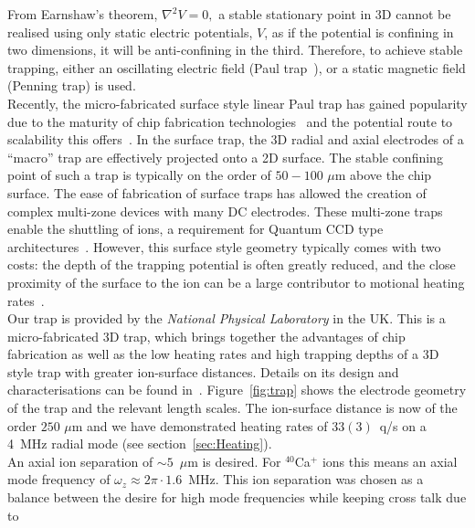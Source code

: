     From Earnshaw's theorem,
    $\nabla^2 V = 0,$ a stable stationary point in 3D cannot be realised
    using only static electric potentials, $V$, as if the potential is confining
    in two dimensions, it will be anti-confining in the third. Therefore, to
    achieve stable trapping, either an oscillating electric field (Paul
    trap~\cite{paul1990electromagnetic}), or a static magnetic field (Penning trap) is
    used.\\
    Recently, the micro-fabricated surface style linear Paul trap has gained
    popularity due to the maturity of chip fabrication
    technologies~\cite{allcock2011surface-electrode} and the potential route
    to scalability this offers~\cite{kielpinski2002architecture}. In the surface trap, the 3D radial and axial
    electrodes of a ``macro'' trap are effectively projected onto a 2D surface.
    The stable confining point of such a trap is typically on the order of $50-100$ $\mu$m
    above the chip surface. The ease of fabrication of surface traps has allowed
    the creation of complex multi-zone devices with many DC electrodes.  These
    multi-zone traps enable the shuttling of ions, a requirement for Quantum CCD
    type architectures~\cite{kielpinski2002architecture}. However, this
    surface style geometry typically comes with two costs: the depth of the
    trapping potential is often greatly reduced, and the close proximity of the
    surface to the ion can be a large contributor to motional heating
    rates~\cite{wineland1998experimental, turchette2000heating}. \\
    Our trap is provided by the \emph{National Physical Laboratory} in the UK. This is a micro-fabricated 3D trap, which brings together the
    advantages of chip fabrication as well as the low heating rates and high
    trapping depths of a 3D style trap with greater ion-surface distances. Details on its design and characterisations can be found in~\cite{see2013fabrication,
    wilpers2012monolithic}. Figure~\ref{fig:trap} shows the electrode geometry of the trap and the relevant length scales.
    The ion-surface distance is now of the order $250$ $\mu$m and we have
    demonstrated heating rates of $ 33(3)$~q/s on a 4~MHz radial mode (see
    section~\ref{sec:Heating}).\\
    An axial ion separation of $\sim 5$~$\mu$m is desired. For
    $^{40}$Ca$^{+}$ ions this means an axial mode frequency of $\omega_z \approx 2\pi
    \cdot 1.6$~MHz. This ion separation was chosen as a balance between the
    desire for high mode frequencies while keeping cross talk due to
